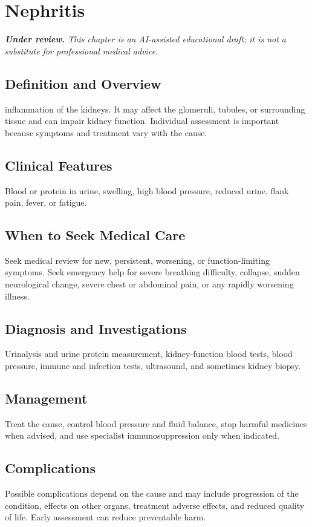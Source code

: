 \chapter{Nephritis}

\medskip
\noindent\textit{\textbf{Under review.} This chapter is an AI-assisted educational draft; it is not a substitute for professional medical advice.}

\section*{Definition and Overview}
inflammation of the kidneys. It may affect the glomeruli, tubules, or surrounding tissue and can impair kidney function. Individual assessment is important because symptoms and treatment vary with the cause.

\section*{Clinical Features}
Blood or protein in urine, swelling, high blood pressure, reduced urine, flank pain, fever, or fatigue.

\section*{When to Seek Medical Care}
Seek medical review for new, persistent, worsening, or function-limiting symptoms. Seek emergency help for severe breathing difficulty, collapse, sudden neurological change, severe chest or abdominal pain, or any rapidly worsening illness.

\section*{Diagnosis and Investigations}
Urinalysis and urine protein measurement, kidney-function blood tests, blood pressure, immune and infection tests, ultrasound, and sometimes kidney biopsy.

\section*{Management}
Treat the cause, control blood pressure and fluid balance, stop harmful medicines when advised, and use specialist immunosuppression only when indicated.

\section*{Complications}
Possible complications depend on the cause and may include progression of the condition, effects on other organs, treatment adverse effects, and reduced quality of life. Early assessment can reduce preventable harm.

